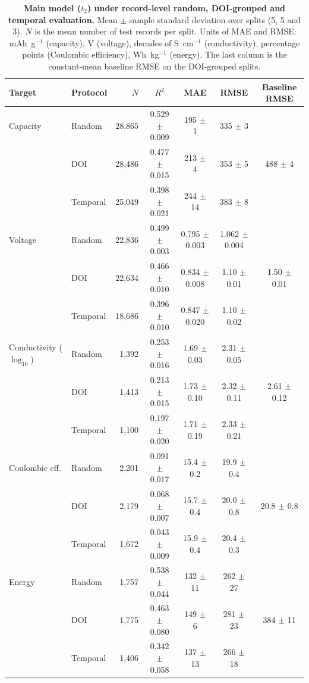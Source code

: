 \documentclass[3p]{elsarticle}
\begin{document}
\clearpage
\begin{table}[H]
    \centering\small
    \caption{\textbf{Main model ($t_2$) under record-level random, DOI-grouped and temporal evaluation.} Mean $\pm$ sample standard deviation over splits (5, 5 and 3). $N$ is the mean number of test records per split. Units of MAE and RMSE: mAh~g$^{-1}$ (capacity), V (voltage), decades of S~cm$^{-1}$ (conductivity), percentage points (Coulombic efficiency), Wh~kg$^{-1}$ (energy). The last column is the constant-mean baseline RMSE on the DOI-grouped splits.}
    \label{tab:split}
    \begin{tabular}{@{}llrcccc@{}}
        \toprule
        Target & Protocol & $N$ & $R^2$ & MAE & RMSE & Baseline RMSE \\
        \midrule
        Capacity & Random   & 28,865 & 0.529 $\pm$ 0.009 & 195 $\pm$ 1 & 335 $\pm$ 3 & \\
        & DOI      & 28,486 & 0.477 $\pm$ 0.015 & 213 $\pm$ 4 & 353 $\pm$ 5 & 488 $\pm$ 4 \\
        & Temporal & 25,049 & 0.398 $\pm$ 0.021 & 244 $\pm$ 14 & 383 $\pm$ 8 & \\
        \midrule
        Voltage  & Random   & 22,836 & 0.499 $\pm$ 0.003 & 0.795 $\pm$ 0.003 & 1.062 $\pm$ 0.004 & \\
        & DOI      & 22,634 & 0.466 $\pm$ 0.010 & 0.834 $\pm$ 0.008 & 1.10 $\pm$ 0.01 & 1.50 $\pm$ 0.01 \\
        & Temporal & 18,686 & 0.396 $\pm$ 0.010 & 0.847 $\pm$ 0.020 & 1.10 $\pm$ 0.02 & \\
        \midrule
        Conductivity ($\log_{10}$) & Random & 1,392 & 0.253 $\pm$ 0.016 & 1.69 $\pm$ 0.03 & 2.31 $\pm$ 0.05 & \\
        & DOI      & 1,413 & 0.213 $\pm$ 0.015 & 1.73 $\pm$ 0.10 & 2.32 $\pm$ 0.11 & 2.61 $\pm$ 0.12 \\
        & Temporal & 1,100 & 0.197 $\pm$ 0.020 & 1.71 $\pm$ 0.19 & 2.33 $\pm$ 0.21 & \\
        \midrule
        Coulombic eff. & Random & 2,201 & 0.091 $\pm$ 0.017 & 15.4 $\pm$ 0.2 & 19.9 $\pm$ 0.4 & \\
        & DOI      & 2,179 & 0.068 $\pm$ 0.007 & 15.7 $\pm$ 0.4 & 20.0 $\pm$ 0.8 & 20.8 $\pm$ 0.8 \\
        & Temporal & 1,672 & 0.043 $\pm$ 0.009 & 15.9 $\pm$ 0.4 & 20.4 $\pm$ 0.3 & \\
        \midrule
        Energy   & Random   & 1,757 & 0.538 $\pm$ 0.044 & 132 $\pm$ 11 & 262 $\pm$ 27 & \\
        & DOI      & 1,775 & 0.463 $\pm$ 0.080 & 149 $\pm$ 6 & 281 $\pm$ 23 & 384 $\pm$ 11 \\
        & Temporal & 1,406 & 0.342 $\pm$ 0.058 & 137 $\pm$ 13 & 266 $\pm$ 18 & \\
        \bottomrule
    \end{tabular}
\end{table}
\end{document}

